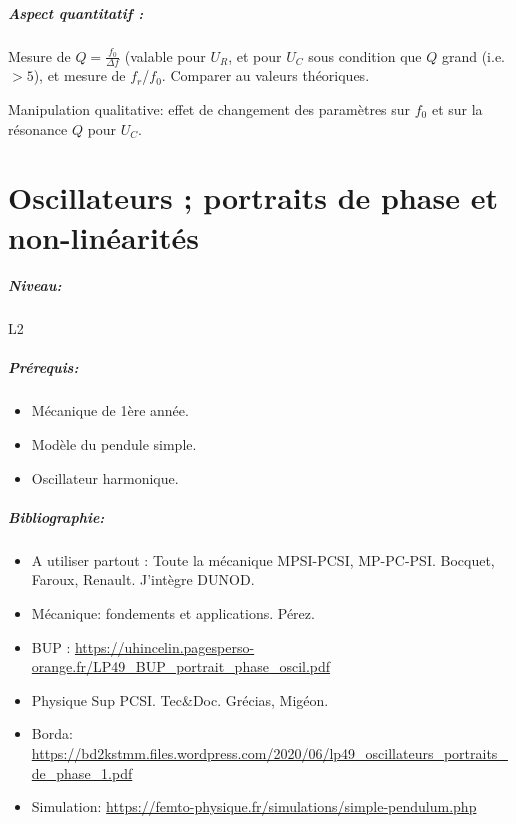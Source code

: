 \documentclass[11pt]{report}
\numberwithin{figure}{section}
\numberwithin{equation}{section}
\numberwithin{table}{section}
\newcommand{\1}{\boldsymbol{1}}
\begin{document}
\begin{tcolorbox}[breakable, enhanced, colback=red!2!white,colframe=mycolor!85!black,title=\textbf{\textbf{Expérience}}]
\paragraph*{Aspect quantitatif :} Mesure de $Q = \frac{f_0}{\Delta f}$ (valable pour $U_R$, et pour $U_C$ sous condition que $Q$ grand (i.e. $>5$), et mesure de $f_r$/$f_0$. Comparer au valeurs théoriques. 

Manipulation qualitative: effet de changement des paramètres sur $f_0$ et sur la résonance $Q$ pour $U_C$.


\end{tcolorbox}


\newpage




\chapter{Oscillateurs ; portraits de phase et non-linéarités}


\paragraph*{Niveau:} L2
\paragraph*{Prérequis:} 
\begin{itemize}
\item Mécanique de 1ère année.
\item Modèle du pendule simple.
\item Oscillateur harmonique.
\end{itemize}

\paragraph*{Bibliographie:}
\begin{itemize}
\item A utiliser partout : Toute la mécanique MPSI-PCSI, MP-PC-PSI. Bocquet, Faroux, Renault. J'intègre DUNOD.
\item Mécanique: fondements et applications. Pérez.
\item BUP : \url{https://uhincelin.pagesperso-orange.fr/LP49_BUP_portrait_phase_oscil.pdf}
\item Physique Sup PCSI. Tec\&Doc. Grécias, Migéon.
\item Borda: \url{https://bd2kstmm.files.wordpress.com/2020/06/lp49_oscillateurs_portraits_de_phase_1.pdf}
\item Simulation: \url{https://femto-physique.fr/simulations/simple-pendulum.php}
\end{itemize}
\end{document}
